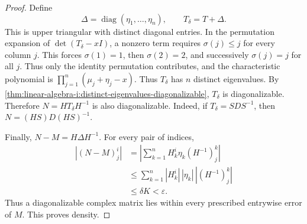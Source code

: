 \begin{pendingreview}
\begin{proof}
  Define
  \[
    \Delta=\operatorname{diag}(\eta_1,\ldots,\eta_n),
    \qquad T_\delta=T+\Delta.
  \]
  This is upper triangular with distinct diagonal entries. In the
  permutation expansion of \(\det(T_\delta-xI)\), a nonzero term
  requires \(\sigma(j)\le j\) for every column \(j\). This forces
  \(\sigma(1)=1\), then \(\sigma(2)=2\), and successively
  \(\sigma(j)=j\) for all \(j\). Thus only the identity permutation
  contributes, and the characteristic polynomial is
  \(\prod_{j=1}^n(\mu_j+\eta_j-x)\). Thus \(T_\delta\) has
  \(n\) distinct eigenvalues. By
  \autoref{thm:linear-algebra-i:distinct-eigenvalues-diagonalizable},
  \(T_\delta\) is diagonalizable. Therefore \(N=HT_\delta H^{-1}\) is also
  diagonalizable. Indeed, if \(T_\delta=SDS^{-1}\), then
  \(N=(HS)D(HS)^{-1}\).

  Finally, \(N-M=H\Delta H^{-1}\). For every pair of indices,
  \[
    \begin{aligned}
      |(N-M)^i_j|
        &=\left|\sum_{k=1}^n H^i_k\eta_k(H^{-1})^k_j\right|\\
        &\le\sum_{k=1}^n |H^i_k|\,|\eta_k|\,|(H^{-1})^k_j|\\
        &\le\delta K<\varepsilon.
    \end{aligned}
  \]
  Thus a diagonalizable complex matrix lies within every prescribed
  entrywise error of \(M\). This proves density.
\end{proof}
\end{pendingreview}
